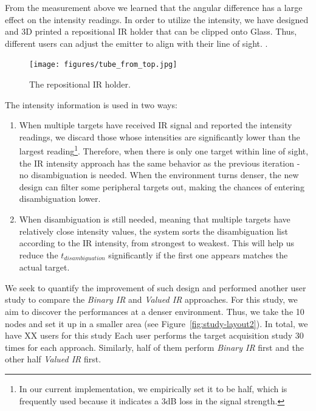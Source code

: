 From the measurement above we learned that the angular difference has a large effect on the intensity readings. In order to utilize the intensity, we have designed and 3D printed a repositional IR holder that can be clipped onto Glass. Thus, different users can adjust the emitter to align with their line of sight. . 

\begin{figure}[t]
\centering
\texttt{[image: figures/tube\_from\_top.jpg]}
\caption{The repositional IR holder.}
\label{fig:measurement}
\end{figure}



The intensity information is used in two ways:
\begin{enumerate}
\item When multiple targets have received IR signal and reported the intensity readings, we discard those whose intensities are significantly lower than the largest reading\footnote{In our current implementation, we empirically set it to be half, which is frequently used because it indicates a 3dB loss in the signal strength.}. Therefore, when there is only one target within line of sight, the IR intensity approach has the same behavior as the previous iteration - no disambiguation is needed. When the environment turns denser, the new design can filter some peripheral targets out, making the chances of entering disambiguation lower.
\item When disambiguation is still needed, meaning that multiple targets have relatively close intensity values, the system sorts the disambiguation list according to the IR intensity, from strongest to weakest. This will help us reduce the $t_{disambiguation}$ significantly if the first one appears matches the actual target.
\end{enumerate}

We seek to quantify the improvement of such design and performed another user study to compare the {\em Binary IR} and {\em Valued IR} approaches. For this study, we aim to discover the performances at a denser environment. Thus, we take the 10 nodes and set it up in a smaller area (see Figure~\ref{fig:study-layout2}). In total, we have XX users for this study  Each user performs the target acquisition study 30 times for each approach. Similarly, half of them perform {\em Binary IR} first and the other half {\em Valued IR} first.

